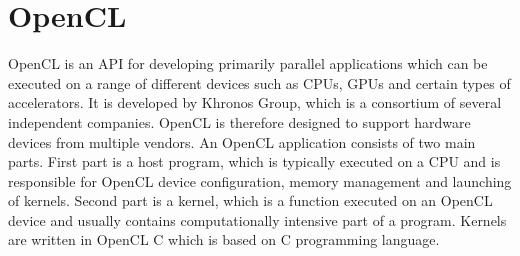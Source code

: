 \documentclass
[
    digital, %
    oneside, %
    table, %
    nolof, %
    nolot, %
    nocover %
]{fithesis3}
\begin{document}
\section{OpenCL}
OpenCL is an API for developing primarily parallel applications which can be executed on a range of different devices such as CPUs, GPUs and certain
types of accelerators. It is developed by Khronos Group, which is a consortium of several independent companies. OpenCL is therefore designed to support
hardware devices from multiple vendors. An OpenCL application consists of two main parts. First part is a host program, which is typically executed on
a CPU and is responsible for OpenCL device configuration, memory management and launching of kernels. Second part is a kernel, which is a function
executed on an OpenCL device and usually contains computationally intensive part of a program. Kernels are written in OpenCL C which is based on C
programming language.
\end{document}
